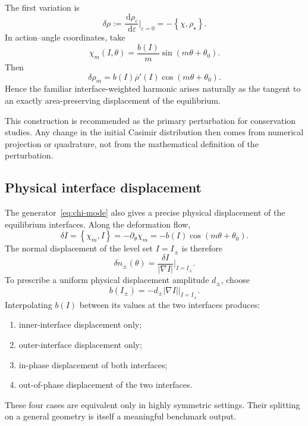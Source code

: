 \documentclass[11pt,a4paper]{article}
\newcommand{\dd}{\,\mathrm{d}}
\newcommand{\bracket}[2]{\left\{#1,#2\right\}}
\newcommand{\abs}[1]{\left|#1\right|}
\begin{document}
The first variation is
\begin{equation}
  \delta\rho
  :=\frac{\dd\rho_\varepsilon}{\dd\varepsilon}\bigg|_{\varepsilon=0}
  =-\bracket{\chi}{\rho_\star}.
  \label{eq:isovortical-tangent}
\end{equation}
In action--angle coordinates, take
\begin{equation}
  \chi_m(I,\theta)
  =\frac{b(I)}{m}\sin(m\theta+\theta_0).
  \label{eq:chi-mode}
\end{equation}
Then
\begin{equation}
  \delta\rho_m
  =b(I)\overline\rho'(I)
   \cos(m\theta+\theta_0).
  \label{eq:isovortical-mode}
\end{equation}
Hence the familiar interface-weighted harmonic arises naturally as the tangent to an exactly area-preserving displacement of the equilibrium.

This construction is recommended as the primary perturbation for conservation studies. Any change in the initial Casimir distribution then comes from numerical projection or quadrature, not from the mathematical definition of the perturbation.

\subsection{Physical interface displacement}

The generator~\eqref{eq:chi-mode} also gives a precise physical displacement of the equilibrium interfaces. Along the deformation flow,
\begin{equation}
  \delta I
  =\bracket{\chi_m}{I}
  =-\partial_\theta\chi_m
  =-b(I)\cos(m\theta+\theta_0).
  \label{eq:action-displacement}
\end{equation}
The normal displacement of the level set $I=I_\pm$ is therefore
\begin{equation}
  \delta n_\pm(\theta)
  =\frac{\delta I}{\abs{\nabla I}}
  \bigg|_{I=I_\pm}.
  \label{eq:normal-displacement}
\end{equation}
To prescribe a uniform physical displacement amplitude $d_\pm$, choose
\begin{equation}
  b(I_\pm)=-d_\pm\abs{\nabla I}\big|_{I=I_\pm}.
  \label{eq:b-physical-displacement}
\end{equation}
Interpolating $b(I)$ between its values at the two interfaces produces:
\begin{enumerate}[label=(\roman*)]
  \item inner-interface displacement only;
  \item outer-interface displacement only;
  \item in-phase displacement of both interfaces;
  \item out-of-phase displacement of the two interfaces.
\end{enumerate}
These four cases are equivalent only in highly symmetric settings. Their splitting on a general geometry is itself a meaningful benchmark output.
\end{document}
